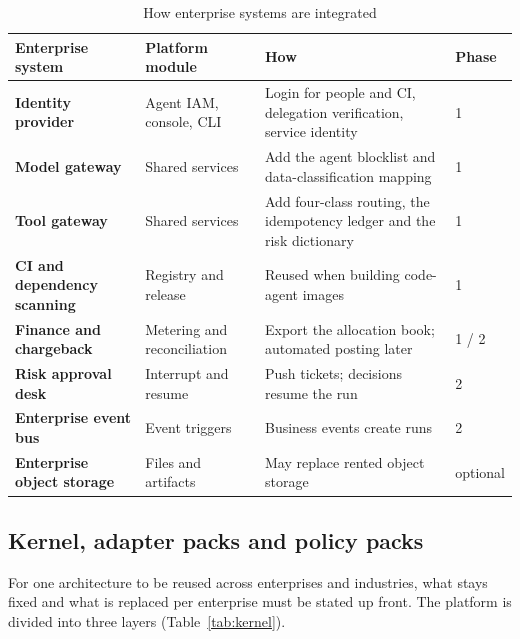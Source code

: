 \begin{table}[htbp]
\centering
\caption{How enterprise systems are integrated}
\label{tab:integration}
\begin{tabularx}{\textwidth}{@{}>{\bfseries}L{3.0cm}L{3.6cm}Y C{1.3cm}@{}}
  \toprule
  \textbf{Enterprise system} & \textbf{Platform module} & \textbf{How} & \textbf{Phase}\\
  \midrule
  Identity provider & Agent IAM, console, CLI & Login for people and CI, delegation verification, service identity & 1\\
  Model gateway & Shared services & Add the agent blocklist and data-classification mapping & 1\\
  Tool gateway & Shared services & Add four-class routing, the idempotency ledger and the risk dictionary & 1\\
  CI and dependency scanning & Registry and release & Reused when building code-agent images & 1\\
  Finance and chargeback & Metering and reconciliation & Export the allocation book; automated posting later & 1 / 2\\
  Risk approval desk & Interrupt and resume & Push tickets; decisions resume the run & 2\\
  Enterprise event bus & Event triggers & Business events create runs & 2\\
  Enterprise object storage & Files and artifacts & May replace rented object storage & optional\\
  \bottomrule
\end{tabularx}
\end{table}

\subsection{Kernel, adapter packs and policy packs}

For one architecture to be reused across enterprises and industries, what stays fixed and what is replaced per enterprise must be stated up front. The platform is divided into three layers (Table~\ref{tab:kernel}).

